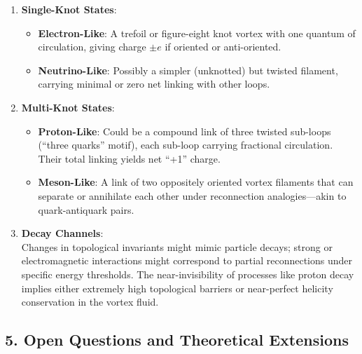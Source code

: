 \begin{enumerate}
    \item \textbf{Single-Knot States}:
    \begin{itemize}
        \item \textbf{Electron-Like}: A trefoil or figure-eight knot vortex with one quantum of circulation, giving charge \(\pm e\) if oriented or anti-oriented.
        \item \textbf{Neutrino-Like}: Possibly a simpler (unknotted) but twisted filament, carrying minimal or zero net linking with other loops.
    \end{itemize}
    \item \textbf{Multi-Knot States}:
    \begin{itemize}
        \item \textbf{Proton-Like}: Could be a compound link of three twisted sub-loops (“three quarks” motif), each sub-loop carrying fractional circulation. Their total linking yields net “+1” charge.
        \item \textbf{Meson-Like}: A link of two oppositely oriented vortex filaments that can separate or annihilate each other under reconnection analogies—akin to quark-antiquark pairs.
    \end{itemize}
    \item \textbf{Decay Channels}: \\
    Changes in topological invariants might mimic particle decays; strong or electromagnetic interactions might correspond to partial reconnections under specific energy thresholds. The near-invisibility of processes like proton decay implies either extremely high topological barriers or near-perfect helicity conservation in the vortex fluid.
\end{enumerate}

\subsection*{5. Open Questions and Theoretical Extensions}

